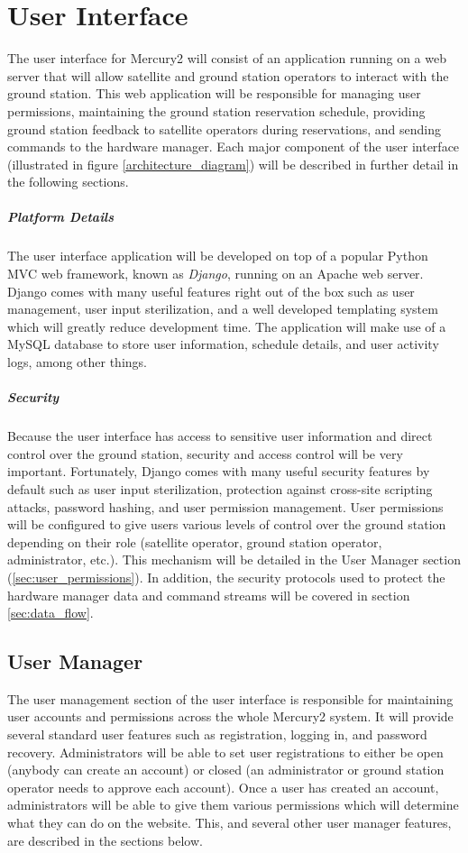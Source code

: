 \documentclass{mxl-design}
\begin{document}
\section{User Interface}
\label{sec:user_interface}
The user interface for Mercury2 will consist of an application running on a web server that will allow satellite and ground station operators to interact with the ground station. This web application will be responsible for managing user permissions, maintaining the ground station reservation schedule, providing ground station feedback to satellite operators during reservations, and sending commands to the hardware manager. Each major component of the user interface (illustrated in figure \ref{architecture_diagram}) will be described in further detail in the following sections.

\subparagraph{Platform Details}
The user interface application will be developed on top of a popular Python MVC web framework, known as \textit{Django}, running on an Apache web server. Django comes with many useful features right out of the box such as user management, user input sterilization, and a well developed templating system which will greatly reduce development time. The application will make use of a MySQL database to store user information, schedule details, and user activity logs, among other things.

\subparagraph{Security}
Because the user interface has access to sensitive user information and direct control over the ground station, security and access control will be very important. Fortunately, Django comes with many useful security features by default such as user input sterilization, protection against cross-site scripting attacks, password hashing, and user permission management. User permissions will be configured to give users various levels of control over the ground station depending on their role (satellite operator, ground station operator, administrator, etc.). This mechanism will be detailed in the User Manager section (\ref{sec:user_permissions}). In addition, the security protocols used to protect the hardware manager data and command streams will be covered in section \ref{sec:data_flow}.

\subsection{User Manager}
\label{sec:user_manager}
The user management section of the user interface is responsible for maintaining user accounts and permissions across the whole Mercury2 system. It will provide several standard user features such as registration, logging in, and password recovery. Administrators will be able to set user registrations to either be open (anybody can create an account) or closed (an administrator or ground station operator needs to approve each account). Once a user has created an account, administrators will be able to give them various permissions which will determine what they can do on the website. This, and several other user manager features, are described in the sections below.
\end{document}
